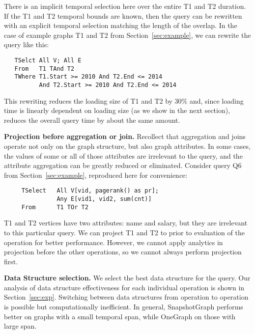 There is an implicit temporal selection here over the entire T1 and T2
duration.  If the T1 and T2 temporal bounds are known, then the query
can be rewritten with an explicit temporal selection matching the
length of the overlap.  In the case of example graphs T1 and T2 from
Section~\ref{sec:example}, we can rewrite the query like this:

\begin{small}
\begin{verbatim}
   TSelct All V; All E
   From   T1 TAnd T2
   TWhere T1.Start >= 2010 And T2.End <= 2014 
          And T2.Start >= 2010 And T2.End <= 2014
\end{verbatim}
\end{small}

This rewriting reduces the loading size of T1 and T2 by 30\% and,
since loading time is linearly dependent on loading size (as we show
in the next section), reduces the overall query time by about the same
amount.

{\bf Projection before aggregation or join.}  Recollect that
aggregation and joins operate not only on the graph structure, but
also graph attributes.  In some cases, the values of some or all of
those attributes are irrelevant to the query, and the attribute
aggregation can be greatly reduced or eliminated.  Consider query Q6
from Section~\ref{sec:example}, reproduced here for convenience:

\begin{small}
\begin{verbatim}
     TSelect   All V[vid, pagerank() as pr]; 
               Any E[vid1, vid2, sum(cnt)]
     From      T1 TOr T2
\end{verbatim}
\end{small}

T1 and T2 vertices have two attributes: name and salary, but they are
irrelevant to this particular query.  We can project T1 and T2 to
 prior to evaluation of the  operation for
better performance.  However, we cannot apply analytics in projection
before the other operations, so we cannot always perform projection
first.

{\bf Data Structure selection.} We select the best data structure for
the query.  Our analysis of data structure effectiveness for each
individual operation is shown in Section~\ref{sec:exp}.  Switching
between data structures from operation to operation is possible but
computationally inefficient.  In general, SnapshotGraph performs better
on graphs with a small temporal span, while OneGraph on those with
large span.

